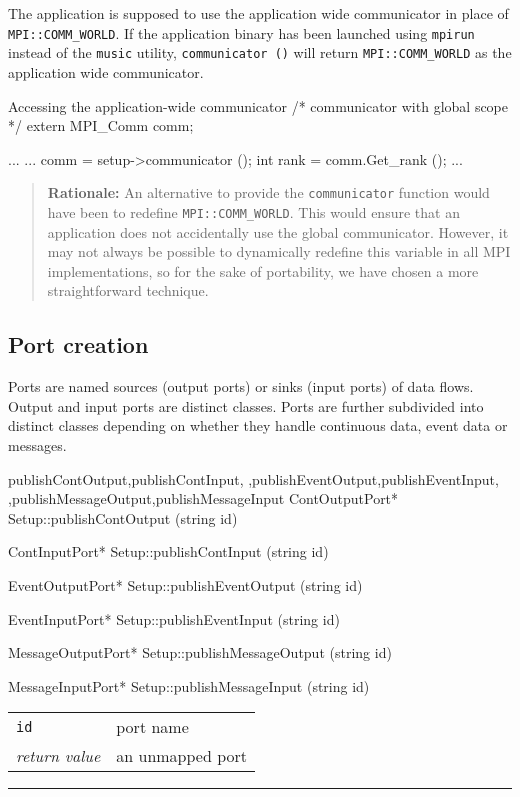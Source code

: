 \documentclass[a4paper,twoside]{report}
\makeatletter
\newenvironment{rationale}%
{\par\begin{quote}\textbf{Rationale:}}%
{\par\end{quote}}
\newenvironment{parameters}%
{\begin{tabular}{@{\hspace{2em}}lp{0.6\textwidth}}}%
{\end{tabular}\par\vspace{1mm}\par\hrule\par\vspace{5mm}}
\makeatother
\begin{document}
The application is supposed to use the application wide communicator
in place of
\lstinline|MPI::COMM_WORLD|. If
the application binary has been launched using \lstinline|mpirun|
instead of the \lstinline|music| utility, \lstinline|communicator ()|
will return \lstinline|MPI::COMM_WORLD| as the application wide
communicator.

\pagebreak
{}
\begin{code}{Accessing the application-wide communicator}
/* communicator with global scope */
extern MPI_Comm comm;

...
{
  ...
  comm = setup->communicator ();
  int rank = comm.Get_rank ();
  ...
}
\end{code}

\begin{rationale}
  An alternative to provide the \lstinline|communicator| function
  would have been to redefine \lstinline|MPI::COMM_WORLD|.  This would
  ensure that an application does not accidentally use the global
  communicator.  However, it may not always be possible to dynamically
  redefine this variable in all MPI implementations, so for the sake
  of portability, we have chosen a more straightforward technique.
\end{rationale}


\subsection{Port creation}

Ports are named sources (output ports) or sinks (input
ports) of data flows.  Output and input ports are distinct classes.
Ports are further subdivided into distinct classes depending on
whether they handle continuous data, event data or messages.

\begin{head}{publishContOutput,publishContInput,
            ,publishEventOutput,publishEventInput,
            ,publishMessageOutput,publishMessageInput}
  ContOutputPort*
  Setup::publishContOutput (string id)

  ContInputPort*
  Setup::publishContInput (string id)

  EventOutputPort*
  Setup::publishEventOutput (string id)

  EventInputPort*
  Setup::publishEventInput (string id)

  MessageOutputPort*
  Setup::publishMessageOutput (string id)

  MessageInputPort*
  Setup::publishMessageInput (string id)
\end{head}
\begin{parameters}
  \lstinline|id| & port name \\
  \emph{return value} & an unmapped port \\
\end{parameters}
\end{document}
